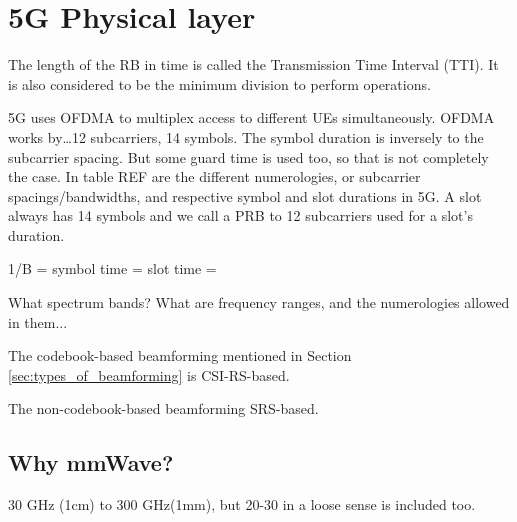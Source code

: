 \section{5G Physical layer}
\label{sec:5gphy}

The length of the RB in time is called the Transmission Time Interval
(TTI). It is also considered to be the minimum division to perform operations. 

5G uses \ac{OFDMA} to multiplex access to different UEs simultaneously. OFDMA works by\dots 12 subcarriers, 14 symbols. The symbol duration is inversely  to the subcarrier spacing. But some guard time is used too, so that is not completely the case. In table REF are the different numerologies, or subcarrier spacings/bandwidths, and respective symbol and slot durations in 5G. A slot always has 14 symbols and we call a \ac{PRB} to 12 subcarriers used for a slot's duration.

1/B = 
symbol time = 
slot time = 


What spectrum bands? What are frequency ranges, and the numerologies allowed in them...



The codebook-based beamforming mentioned in Section \ref{sec:types_of_beamforming} is CSI-RS-based.

The non-codebook-based beamforming SRS-based.




\subsection{Why mmWave?}

30 GHz (1cm) to 300 GHz(1mm), but 20-30 in a loose sense is included too.



